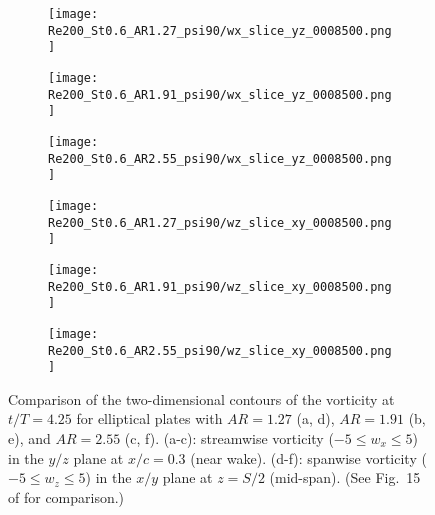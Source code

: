 \begin{figure}[!h]
  \centering
  \begin{subfigure}[c]{0.2\textwidth}
    \centering
    \texttt{[image: Re200\_St0.6\_AR1.27\_psi90/wx\_slice\_yz\_0008500.png]}
    \caption{}
    \label{fig:ratio_vorticity_slices:1.27_wx}
  \end{subfigure}
  \hspace{3em}
  \begin{subfigure}[c]{0.2\textwidth}
    \centering
    \texttt{[image: Re200\_St0.6\_AR1.91\_psi90/wx\_slice\_yz\_0008500.png]}
    \caption{}
    \label{fig:ratio_vorticity_slices:1.91_wx}
  \end{subfigure}
  \hspace{3em}
  \begin{subfigure}[c]{0.23\textwidth}
    \centering
    \texttt{[image: Re200\_St0.6\_AR2.55\_psi90/wx\_slice\_yz\_0008500.png]}
    \caption{}
    \label{fig:ratio_vorticity_slices:2.55_wx}
  \end{subfigure}
  \vspace{0.5em}
  \begin{subfigure}[c]{0.32\textwidth}
    \centering
    \texttt{[image: Re200\_St0.6\_AR1.27\_psi90/wz\_slice\_xy\_0008500.png]}
    \caption{}
    \label{fig:ratio_vorticity_slices:1.27_wz}
  \end{subfigure}
  \hspace{0.2em}
  \begin{subfigure}[c]{0.32\textwidth}
    \centering
    \texttt{[image: Re200\_St0.6\_AR1.91\_psi90/wz\_slice\_xy\_0008500.png]}
    \caption{}
    \label{fig:ratio_vorticity_slices:1.91_wz}
  \end{subfigure}
  \hspace{0.2em}
  \begin{subfigure}[c]{0.32\textwidth}
    \centering
    \texttt{[image: Re200\_St0.6\_AR2.55\_psi90/wz\_slice\_xy\_0008500.png]}
    \caption{}
    \label{fig:ratio_vorticity_slices:2.55_wz}
  \end{subfigure}
  \caption{Comparison of the two-dimensional contours of the vorticity at $t/T = 4.25$ for elliptical plates with $AR = 1.27$ (a, d), $AR = 1.91$ (b, e), and $AR = 2.55$ (c, f). (a-c): streamwise vorticity ($-5 \leq w_x \leq 5$) in the $y/z$ plane at $x/c = 0.3$ (near wake). (d-f): spanwise vorticity ($-5 \leq w_z \leq 5$) in the $x/y$ plane at $z = S/2$ (mid-span). (See Fig.~15 of \citet{li_dong_2016} for comparison.)}
  \label{fig:ratio_vorticity_slices}
\end{figure}

